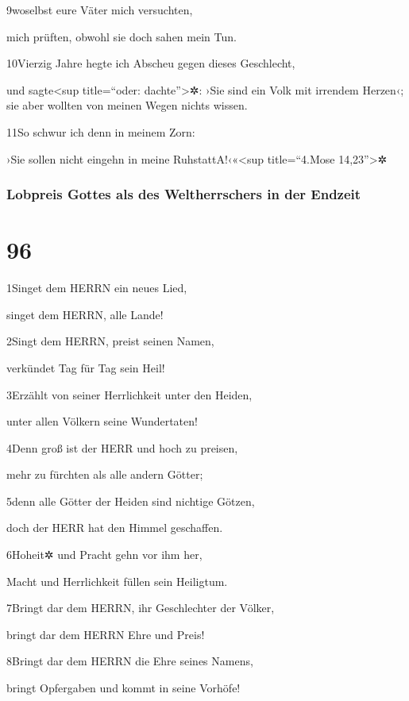 9woselbst eure Väter mich versuchten,

mich prüften, obwohl sie doch sahen mein Tun.

10Vierzig Jahre hegte ich Abscheu gegen dieses Geschlecht,

und sagte\textless sup title=``oder: dachte''\textgreater✲: ›Sie sind
ein Volk mit irrendem Herzen‹; sie aber wollten von meinen Wegen nichts
wissen.

11So schwur ich denn in meinem Zorn:

›Sie sollen nicht eingehn in meine Ruhstatt{A}!‹«\textless sup
title=``4.Mose 14,23''\textgreater✲

\hypertarget{lobpreis-gottes-als-des-weltherrschers-in-der-endzeit}{%
\subsubsection{Lobpreis Gottes als des Weltherrschers in der
Endzeit}\label{lobpreis-gottes-als-des-weltherrschers-in-der-endzeit}}

\hypertarget{section-95}{%
\section{96}\label{section-95}}

1Singet dem HERRN ein neues Lied,

singet dem HERRN, alle Lande!

2Singt dem HERRN, preist seinen Namen,

verkündet Tag für Tag sein Heil!

3Erzählt von seiner Herrlichkeit unter den Heiden,

unter allen Völkern seine Wundertaten!

4Denn groß ist der HERR und hoch zu preisen,

mehr zu fürchten als alle andern Götter;

5denn alle Götter der Heiden sind nichtige Götzen,

doch der HERR hat den Himmel geschaffen.

6Hoheit✲ und Pracht gehn vor ihm her,

Macht und Herrlichkeit füllen sein Heiligtum.

7Bringt dar dem HERRN, ihr Geschlechter der Völker,

bringt dar dem HERRN Ehre und Preis!

8Bringt dar dem HERRN die Ehre seines Namens,

bringt Opfergaben und kommt in seine Vorhöfe!

